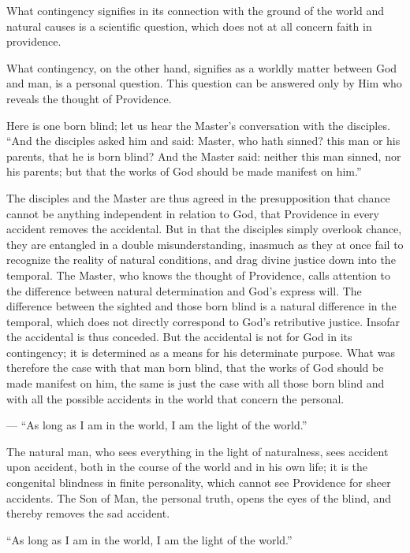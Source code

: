 \documentclass[12pt,a4paper,openany]{book}
\newcommand{\opage}[1]{\marginnote{\footnotesize\textit{[#1]}}}
\begin{document}
What contingency signifies in its connection
with the ground of the world and natural
causes is a scientific question, which
does not at all concern faith in providence.

What contingency, on the other hand, signifies as
a worldly matter between God and
man, is a personal question. This
\setcounter{footnote}{0}%
\opage{35}question can be answered only by Him who  %
reveals the thought of Providence.

Here is one born blind; let us hear the Master's
conversation with the disciples. ``And the disciples
asked him and said: Master, who hath sinned?
this man or his parents, that he is born
blind? And the Master said: neither this man
sinned, nor his parents; but that the
works of God should be made manifest
on him.''

The disciples and the Master are thus agreed in
the presupposition that chance cannot be
anything independent in relation to God, that Providence
in every accident removes the accidental.
But in that the disciples simply overlook chance,
they are entangled in a double misunderstanding, inasmuch as
they at once fail to recognize the reality of natural
conditions, and drag divine
justice down into the temporal. The Master,
who knows the thought of Providence, calls attention
to the difference between natural determination and
God's express will. The difference between
the sighted and those born blind is a natural difference in
the temporal, which does not directly correspond to God's
retributive justice. Insofar the accidental is thus
\setcounter{footnote}{0}%
\opage{36}conceded. But the accidental
is not for God in its contingency;
it is determined as a means for his determinate
purpose. What was therefore the case with
that man born blind, that the works of God should
be made manifest on him, the same is just the case
with all those born blind and with all the possible
accidents in the world that concern the personal.

--- ``As long as I am in the world, I am the light
of the world.''

The natural man, who sees everything in the light of naturalness,
sees accident upon accident,
both in the course of the world and in his own life; it
is the congenital blindness in finite personality,
which cannot see Providence for sheer accidents.
The Son of Man, the personal truth,
opens the eyes of the blind, and thereby removes the
sad accident.

``As long as I am in the world, I am the light of the world.''
\end{document}
